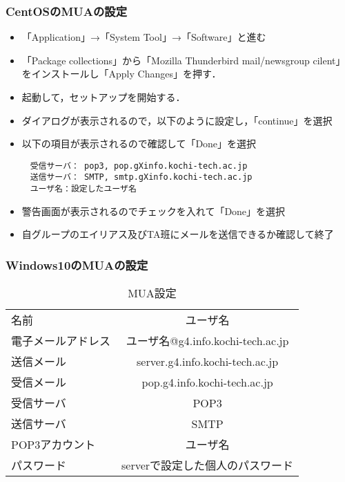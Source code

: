 \documentclass[a4j,titlepage]{jarticle}
\begin{document}
\subsubsection{CentOSのMUAの設定}
\begin{itemize}
\item 「Application」→「System Tool」→「Software」と進む

\item 「Package collections」から「Mozilla Thunderbird mail/newsgroup cilent」をインストールし「Apply Changes」を押す．

\item 起動して，セットアップを開始する．

\item ダイアログが表示されるので，以下のように設定し，「continue」を選択
  
  \item 以下の項目が表示されるので確認して「Done」を選択
  \begin{center}
    \begin{screen}
\begin{verbatim}
　受信サーバ： pop3, pop.gXinfo.kochi-tech.ac.jp
　送信サーバ： SMTP, smtp.gXinfo.kochi-tech.ac.jp
　ユーザ名：設定したユーザ名
\end{verbatim}
    \end{screen}
  \end{center}
  
  \item 警告画面が表示されるのでチェックを入れて「Done」を選択
  
  \item 自グループのエイリアス及びTA班にメールを送信できるか確認して終了
\end{itemize}

\subsubsection{Windows10のMUAの設定}
\begin{table}[htbp]
\caption{MUA設定}
\label{tab:proxy}
\begin{center}
\begin{tabular}{l c}
\hline
名前 & ユーザ名\\ 
電子メールアドレス & ユーザ名@g4.info.kochi-tech.ac.jp\\
送信メール & server.g4.info.kochi-tech.ac.jp\\ 
受信メール & pop.g4.info.kochi-tech.ac.jp\\
受信サーバ & POP3\\
送信サーバ & SMTP\\
POP3アカウント & ユーザ名\\
パスワード & serverで設定した個人のパスワード\\ \hline
\end{tabular}
\end{center}
\end{table}
\end{document}
